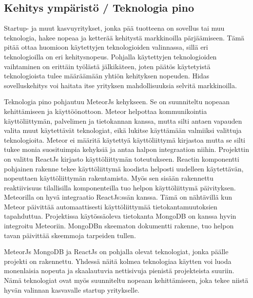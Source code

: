 \documentclass[11pt,a4paper,titlepage,oneside]{article}
\begin{document}
\subsection{Kehitys ympäristö / Teknologia pino}






Startup- ja muut kasvuyritykset, jonka pää tuotteena on sovellus tai muu teknologia, hakee nopeaa ja ketterää kehitystä markkinoilla pärjäämiseen.
Tämä pitää ottaa huomioon käytettyjen teknologioiden valinnassa, sillä eri teknologioilla on eri kehitysnopeus.
Pohjalla käytettyjen teknologioiden vaihtaminen on erittäin työlästä jälkikäteen,
joten päätös käytetyistä teknologioista tulee määräämään yhtiön kehityksen nopeuden.
Hidas sovelluskehitys voi haitata itse yrityksen mahdollisuuksia selvitä markkinoilla.
\medskip




Teknologia pino pohjautuu MeteorJs kehykseen. Se on suunniteltu nopeaan kehittämiseen ja käyttöönottoon.
Meteor helpottaa kommunikointia käyttöliittymän, palvelimen ja tietokannan kanssa, 
mutta silti antaen vapauden valita muut käytettävät teknologiat, eikä lukitse käyttämään valmiiksi valittuja teknologioita.
Meteor ei määritä käytettyä käyttöliittymä kirjastoa mutta se silti tukee monia suosituimpia kehyksiä ja antaa halpon integraation niihin.
Projekttin on valittu ReactJs kirjasto käyttöliittymän toteutukseen.
Reactin komponentti pohjainen rakenne tekee käyttöliittymä koodista helposti uudelleen käytettävän, nopeuttaen käyttöliittymän rakentamista. 
Myös sen sisään rakennettu reaktiivisuus tilallisilla komponenteilla tuo helpon käyttöliittymä päivityksen.
Meteorilla on hyvä integraatio ReactJs:ssän kanssa. 
Tämä on nähtävillä kun Meteor päivittää automaattisesti käyttöliittymää tietokantamuutoksien tapahduttua. 
Projektissa käytössäoleva tietokanta MongoDB on kanssa hyvin integroitu Meteoriin.
MongoDBn skeematon dokumentti rakenne, tuo helpon tavan päivittää skeemmoja tarpeiden tullen.
\medskip



MeteorJs MongoDB ja ReactJs on pohjalla olevat teknologiat, jonka päälle projekti on rakennettu.
Yhdessä näitä kolmea teknologiaa käytten voi luoda monenlaisia nopeuta ja skaalautuvia nettisivuja pienistä projekteista suuriin.
Nämä teknologiat ovat myös suunniteltu nopeaan kehittämiseen, joka tekee niistä hyvän valinnan kasvavalle startup yritykselle.
\medskip
\end{document}
